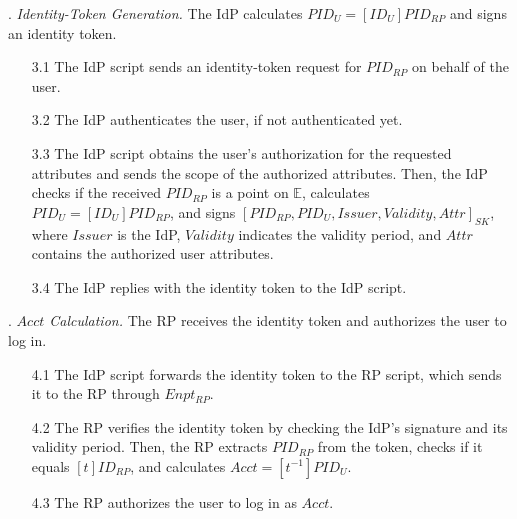 . {\em Identity-Token Generation.}
The IdP calculates $PID_U = [ID_U]{PID_{RP}}$ and signs an identity token. %
\vspace{-\topsep}
\begin{itemize}
\setlength{\topsep}{0pt}
\setlength{\partopsep}{0pt}
\setlength{\itemsep}{0pt}
\setlength{\parsep}{0pt}
\setlength{\parskip}{0pt}
\item[3.1]
The IdP script sends an identity-token request for $PID_{RP}$ on behalf of the user. %

\item[3.2] The IdP authenticates the user, if not authenticated yet.

\item [3.3]
The IdP script obtains the user's authorization for the requested attributes and sends the scope of the authorized attributes. 
\newc
Then, the IdP checks if the received $PID_{RP}$ is a point on $\mathbb{E}$, 
\oldc
calculates $PID_U = [ID_U]{PID_{RP}}$, and signs $[PID_{RP}, PID_U, Issuer, Validity, Attr]_{SK}$, where $Issuer$ is the IdP, $Validity$ indicates the validity period, and $Attr$ contains the authorized user attributes.
\item[3.4] The IdP replies with the identity token to the IdP script.
\end{itemize}

. {\em $Acct$ Calculation.}
The RP receives the identity token and authorizes the user to log in.
\vspace{-\topsep}
\begin{itemize}
\setlength{\topsep}{0pt}
\setlength{\partopsep}{0pt}
\setlength{\itemsep}{0pt}
\setlength{\parsep}{0pt}
\setlength{\parskip}{0pt}
\item [4.1]
The IdP script forwards the identity token to the RP script,
    which sends it to the RP through $Enpt_{RP}$.
\item[4.2] The RP verifies the identity token by checking the IdP's signature and its validity period.
Then, \newc
the RP extracts $PID_{RP}$ from the token, checks if it equals $[t]ID_{RP}$,
\oldc
and calculates $Acct = [t^{-1}]{PID_U}$.

\item [4.3] The RP authorizes the user to log in as $Acct$.

\end{itemize}


